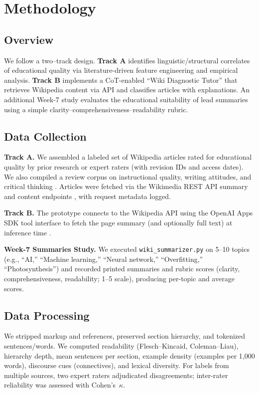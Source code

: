 
\section{Methodology}


\subsection*{Overview}
We follow a two–track design. \textbf{Track A} identifies linguistic/structural correlates of educational quality via literature-driven feature engineering and empirical analysis. \textbf{Track B} implements a CoT-enabled “Wiki Diagnostic Tutor” that retrieves Wikipedia content via API and classifies articles with explanations. An additional Week-7 study evaluates the educational suitability of lead summaries using a simple clarity–comprehensiveness–readability rubric.

\subsection{Data Collection}
\textbf{Track A.} We assembled a labeled set of Wikipedia articles rated for educational quality by prior research or expert raters (with revision IDs and access dates). We also compiled a review corpus on instructional quality, writing attitudes, and critical thinking \cite{ekholm2018clarifying, pithers2000critical, fadhly2022efl}. Articles were fetched via the Wikimedia REST API summary and content endpoints \cite{wikimediaREST}, with request metadata logged.

\textbf{Track B.} The prototype connects to the Wikipedia API using the OpenAI Apps SDK tool interface to fetch the page summary (and optionally full text) at inference time \cite{openaiAppsSDK}. 

\textbf{Week-7 Summaries Study.} We executed \texttt{wiki\_summarizer.py} on 5–10 topics (e.g., “AI,” “Machine learning,” “Neural network,” “Overfitting,” “Photosynthesis”) and recorded printed summaries and rubric scores (clarity, comprehensiveness, readability; 1–5 scale), producing per-topic and average scores.

\subsection{Data Processing}
We stripped markup and references, preserved section hierarchy, and tokenized sentences/words. We computed readability (Flesch–Kincaid, Coleman–Liau), hierarchy depth, mean sentences per section, example density (examples per 1{,}000 words), discourse cues (connectives), and lexical diversity. For labels from multiple sources, two expert raters adjudicated disagreements; inter-rater reliability was assessed with Cohen’s~$\kappa$.

